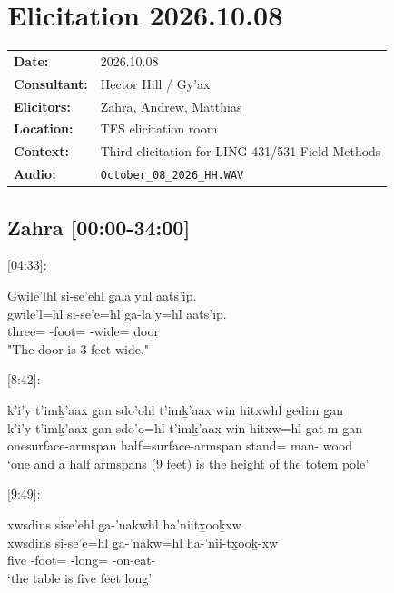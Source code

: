 \renewcommand{\ElicitationDate}{2026.10.08}

\section{Elicitation \ElicitationDate}

\begin{tabular}{ll}
\textbf{Date:} & \ElicitationDate \\
\textbf{Consultant:} & Hector Hill / Gy'ax \\
\textbf{Elicitors:} & Zahra, Andrew, Matthias \\
\textbf{Location:} & TFS elicitation room \\
\textbf{Context:} & Third elicitation for LING 431/531 Field Methods \\
\textbf{Audio:} & \texttt{October\_08\_2026\_HH.WAV} \\
\end{tabular}

\subsection{Zahra [00:00-34:00]}

[04:33]:
\begin{exe}
    \ex \glll
    Gwile’lhl si-se’ehl g̱ala’yhl aats’ip. \\
    gwile’l=hl si-se’e=hl g̱a-la’y=hl aats’ip. \\
    three=\Cn{} \Pl-foot=\Cn{} \Dist-wide=\Cn{} door \\
    \glt "The door is 3 feet wide."
\end{exe}
 
[8:42]:
\begin{exe}
    \ex \glll 
    k'i'y t’imḵ’aax g̱an sdo'ohl t’imḵ’aax win hitxwhl gedim g̱an \\
    k'i'y t’imḵ’aax g̱an sdo'o=hl t’imḵ’aax win hitxw=hl gat-m g̱an \\
    onesurface-armspan \Pcnj{} half=\Cn{}surface-armspan \Comp{} stand=\Cn{} man-\Attr{} wood \\
    \glt `one and a half armspans (9 feet) is the height of the totem pole'
\end{exe}

[9:49]: \begin{exe}
    \ex \glll
    xwsdins sise’ehl g̱a-’nakwhl ha’niitx̱ooḵxw \\
    xwsdins si-se’e=hl g̱a-’nakw=hl ha-’nii-tx̱ooḵ-xw \\
    five \Pl-foot=\Cn{} \Dist-long=\Cn{} \Ins-on-eat-\Val{} \\
    \glt `the table is five feet long'
\end{exe}

